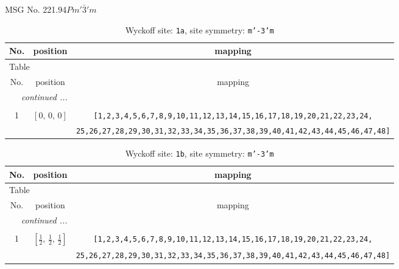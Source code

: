 \documentclass[fleqn,8pt]{jsarticle}
\begin{document}
\setcounter{MaxMatrixCols}{32}

\renewcommand{\tablename}{Table~}
\renewcommand{\figurename}{Figure~}
\begin{center}
\LARGE
MSG No. 221.94\quad$Pm'\bar{3}'m$
\end{center}
\renewcommand{\arraystretch}{1.2}
\begin{longtable}{ccc}
\caption{Wyckoff site: {\tt 1a}, site symmetry: {\tt m'-3'm}}
 \\
 \hline \hline
No. & position & mapping \\ \hline \endfirsthead

\multicolumn{2}{l}{\tablename\ \thetable{}} \\
 \hline \hline
No. & position & mapping \\ \hline \endhead

 \hline \hline
\multicolumn{2}{r}{\footnotesize\it continued ...} \\ \endfoot

 \hline \hline
\multicolumn{2}{r}{} \\ \endlastfoot

1 & $\left[ 0,\, 0,\, 0 \right]$ & {\tt [1,2,3,4,5,6,7,8,9,10,11,12,13,14,15,16,17,18,19,20,21,22,23,24,} \\ \hline
 &  & {\tt 25,26,27,28,29,30,31,32,33,34,35,36,37,38,39,40,41,42,43,44,45,46,47,48]} \\
\end{longtable}
\renewcommand{\arraystretch}{1.2}
\begin{longtable}{ccc}
\caption{Wyckoff site: {\tt 1b}, site symmetry: {\tt m'-3'm}}
 \\
 \hline \hline
No. & position & mapping \\ \hline \endfirsthead

\multicolumn{2}{l}{\tablename\ \thetable{}} \\
 \hline \hline
No. & position & mapping \\ \hline \endhead

 \hline \hline
\multicolumn{2}{r}{\footnotesize\it continued ...} \\ \endfoot

 \hline \hline
\multicolumn{2}{r}{} \\ \endlastfoot

1 & $\left[ \frac{1}{2},\, \frac{1}{2},\, \frac{1}{2} \right]$ & {\tt [1,2,3,4,5,6,7,8,9,10,11,12,13,14,15,16,17,18,19,20,21,22,23,24,} \\ \hline
 &  & {\tt 25,26,27,28,29,30,31,32,33,34,35,36,37,38,39,40,41,42,43,44,45,46,47,48]} \\
\end{longtable}
\end{document}

